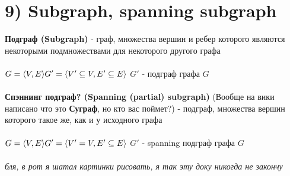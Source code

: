 \documentclass[../TM3-UltraDoc.tex]{subfiles}
\begin{document}
	\section*{9) Subgraph, spanning subgraph}
	\textbf{Подграф (Subgraph)} - граф, множества вершин и ребер которого являются некоторыми подмножествами для некоторого другого графа\\
	\\
	\(
	G = \langle V, E\rangle\\
	G' = \langle V' \subseteq V, E' \subseteq E \rangle
	\)
	$G'$ - подграф графа $G$\\
	\\
	\textbf{Спэннинг подграф? (Spanning (partial) subgraph)} (Вообще на вики написано что это \textbf{Суграф}, но кто вас поймет?) - подграф, множества вершин которого такое же, как и у исходного графа\\
	\\
	\(
	G = \langle V, E\rangle\\
	G' = \langle V' = V, E' \subseteq E \rangle
	\)
	$G'$ - spanning подграф графа $G$\\
	\\
	\textit{бля, в рот я шатал картинки рисовать, я так эту доку никогда не закончу}
	
\end{document}
